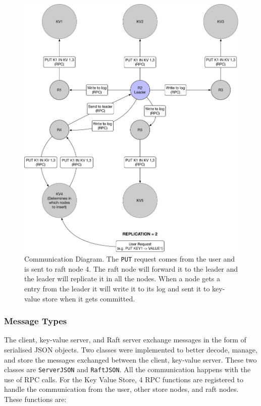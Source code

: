 \documentclass{article}
\begin{document}
\begin{figure}
  \centering
  \includegraphics[width=\textwidth]{communication_diagram.pdf}
  \caption{Communication Diagram. The \texttt{PUT} request comes from the user and is sent to raft node 4. The raft node will forward it to the leader and the leader will replicate it in all the nodes. When a node gets a entry from the leader it will write it to its log and sent it to key-value store when it gets committed.}
  \label{fig:communication}
\end{figure}


\subsubsection{Message Types}
The client, key-value server, and Raft server exchange messages in the form of serialised JSON 
objects. Two classes were implemented to better decode, manage, and store the messages exchanged 
between the client, key-value server. These two classes are \texttt{ServerJSON} 
and \texttt{RaftJSON}. All the communication happens with the use of RPC calls. For the Key Value
Store, 4 RPC functions are registered to handle the communication from the user, other store nodes, 
and raft nodes. These functions are:
\end{document}
